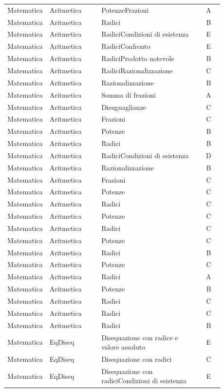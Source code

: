 \documentclass[20pt, a4paper]{article}
\begin{document}
\begin{longtable}{@{}>{\raggedright\arraybackslash}p{0.18\linewidth}>{\raggedright\arraybackslash}p{0.24\linewidth}>{\raggedright\arraybackslash}p{0.46\linewidth}c@{}}
Matematica & Aritmetica & PotenzeFrazioni & A \\
Matematica & Aritmetica & Radici & B \\
Matematica & Aritmetica & RadiciCondizioni di esistenza & E \\
Matematica & Aritmetica & RadiciConfronto & E \\
Matematica & Aritmetica & RadiciProdotto notevole & B \\
Matematica & Aritmetica & RadiciRazionalizzazione & C \\
Matematica & Aritmetica & Razionalizzazione & B \\
Matematica & Aritmetica & Somma di frazioni & A \\
Matematica & Aritmetica & Disuguaglianze & C \\
Matematica & Aritmetica & Frazioni & C \\
Matematica & Aritmetica & Potenze & B \\
Matematica & Aritmetica & Radici & B \\
Matematica & Aritmetica & RadiciCondizioni di esistenza & D \\
Matematica & Aritmetica & Razionalizzazione & B \\
Matematica & Aritmetica & Frazioni & C \\
Matematica & Aritmetica & Potenze & C \\
Matematica & Aritmetica & Radici & C \\
Matematica & Aritmetica & Potenze & C \\
Matematica & Aritmetica & Radici & C \\
Matematica & Aritmetica & Potenze & C \\
Matematica & Aritmetica & Radici & B \\
Matematica & Aritmetica & Potenze & C \\
Matematica & Aritmetica & Radici & A \\
Matematica & Aritmetica & Potenze & B \\
Matematica & Aritmetica & Radici & C \\
Matematica & Aritmetica & Radici & C \\
Matematica & Aritmetica & Radici & B \\
Matematica & EqDiseq & Disequazione con radice e valore assoluto & E \\
Matematica & EqDiseq & Disequazione con radici & C \\
Matematica & EqDiseq & Disequazione con radiciCondizioni di esistenza & E \\

\end{longtable}
\end{document}
